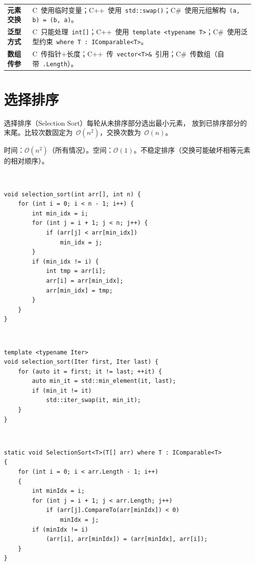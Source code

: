 \documentclass[12pt,a4paper,fontset=fandol]{ctexbook}
\newcommand{\clabel}{%
  \noindent\begin{tcolorbox}[sharp corners,colback=cheadbg,colframe=cheadbg,
    left=6pt,right=6pt,top=2pt,bottom=2pt,boxrule=0pt]
  \textcolor{white}{\small\bfseries\sffamily C}\end{tcolorbox}%
}
\newcommand{\cpplabel}{%
  \noindent\begin{tcolorbox}[sharp corners,colback=cppheadbg,colframe=cppheadbg,
    left=6pt,right=6pt,top=2pt,bottom=2pt,boxrule=0pt]
  \textcolor{white}{\small\bfseries\sffamily C++}\end{tcolorbox}%
}
\newcommand{\csharplabel}{%
  \noindent\begin{tcolorbox}[sharp corners,colback=csharpheadbg,colframe=csharpheadbg,
    left=6pt,right=6pt,top=2pt,bottom=2pt,boxrule=0pt]
  \textcolor{white}{\small\bfseries\sffamily C\#}\end{tcolorbox}%
}
\newcommand{\bigO}[1]{\mathcal{O}(#1)}
\newcommand{\Fn}[1]{\texttt{#1()}}
\begin{document}
\begin{compare}
\begin{tabularx}{\textwidth}{lX}
  \textbf{元素交换} & C~使用临时变量；C++~使用~\Fn{std::swap}；C\#~使用元组解构~\texttt{(a, b) = (b, a)}。\\
  \textbf{泛型方式} & C~只能处理~\texttt{int[]}；C++~使用~\texttt{template <typename T>}；C\#~使用泛型约束~\texttt{where T : IComparable<T>}。\\
  \textbf{数组传参} & C~传指针+长度；C++~传~\texttt{vector<T>\&}~引用；C\#~传数组（自带~\texttt{.Length}）。\\
\end{tabularx}
\end{compare}

\chapter{选择排序}

选择排序（Selection Sort）每轮从未排序部分选出最小元素，
放到已排序部分的末尾。比较次数固定为~$\bigO{n^2}$，交换次数为~$\bigO{n}$。

\begin{complexitybox}
  时间：$\bigO{n^2}$（所有情况）。空间：$\bigO{1}$。不稳定排序（交换可能破坏相等元素的相对顺序）。
\end{complexitybox}

\clabel
\begin{lstlisting}[style=cstyle]
void selection_sort(int arr[], int n) {
    for (int i = 0; i < n - 1; i++) {
        int min_idx = i;
        for (int j = i + 1; j < n; j++) {
            if (arr[j] < arr[min_idx])
                min_idx = j;
        }
        if (min_idx != i) {
            int tmp = arr[i];
            arr[i] = arr[min_idx];
            arr[min_idx] = tmp;
        }
    }
}
\end{lstlisting}

\cpplabel
\begin{lstlisting}[style=cppstyle]
template <typename Iter>
void selection_sort(Iter first, Iter last) {
    for (auto it = first; it != last; ++it) {
        auto min_it = std::min_element(it, last);
        if (min_it != it)
            std::iter_swap(it, min_it);
    }
}
\end{lstlisting}

\csharplabel
\begin{lstlisting}[style=csharpstyle]
static void SelectionSort<T>(T[] arr) where T : IComparable<T>
{
    for (int i = 0; i < arr.Length - 1; i++)
    {
        int minIdx = i;
        for (int j = i + 1; j < arr.Length; j++)
            if (arr[j].CompareTo(arr[minIdx]) < 0)
                minIdx = j;
        if (minIdx != i)
            (arr[i], arr[minIdx]) = (arr[minIdx], arr[i]);
    }
}
\end{lstlisting}
\end{document}
